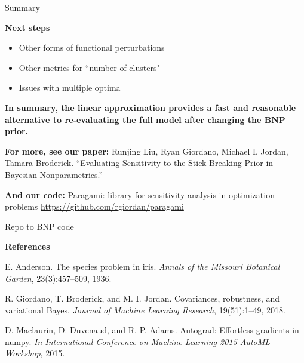 \documentclass[10pt]{beamer}\usepackage[]{graphicx}\usepackage[]{color}
\begin{document}
\begin{frame}{Summary}

{\bf Next steps}
\begin{itemize}
\item Other forms of functional perturbations
\pause 
\item Other metrics for ``number of clusters"
\pause
\item Issues with multiple optima
\pause 
\end{itemize}
\vspace{0.2in}

\begin{mdframed}[style=MyFrame]
\begin{center}
{\bf In summary, the linear approximation provides a fast and reasonable alternative to re-evaluating the full model after changing the BNP prior.}
\end{center}
\end{mdframed}

\end{frame}

\begin{frame}

{\bf For more, see our paper: }\newline
Runjing Liu, Ryan Giordano, Michael I. Jordan, Tamara Broderick. \newline
“Evaluating Sensitivity to the Stick Breaking Prior in Bayesian Nonparametrics.” 

{\bf And our code: }\newline
Paragami: library for sensitivity analysis in optimization problems \newline
{\color{blue}\url{https://github.com/rgiordan/paragami}}

Repo to BNP code

\vspace{0.2in}

\begin{scriptsize}

{\bf References}

E. Anderson. The species problem in iris. {\itshape Annals of the Missouri Botanical Garden}, 23(3):457–509, 1936.

R. Giordano, T. Broderick, and M. I. Jordan. Covariances, robustness, and variational Bayes. {\itshape Journal of Machine Learning Research}, 19(51):1–49, 2018.

D. Maclaurin, D. Duvenaud, and R. P. Adams. Autograd: Effortless gradients in numpy. {\itshape In International Conference on Machine Learning 2015 AutoML Workshop}, 2015.

\end{scriptsize}

\end{frame}
\end{document}
